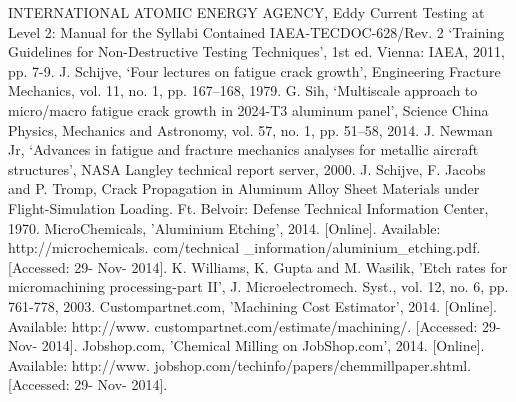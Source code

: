 \documentclass[12pt]{article}
\begin{document}
\noindent
[1] INTERNATIONAL ATOMIC ENERGY AGENCY, Eddy Current Testing at Level 2: Manual for the Syllabi Contained IAEA-TECDOC-628/Rev. 2 `Training Guidelines for Non-Destructive Testing Techniques', 1st ed. Vienna: IAEA, 2011, pp. 7-9.
\newline
\newline
\noindent
[2] J. Schijve, `Four lectures on fatigue crack growth', Engineering Fracture Mechanics, vol. 11, no. 1, pp. 167--168, 1979.
\newline
\newline
\noindent
[3] G. Sih, `Multiscale approach to micro/macro fatigue crack growth in 2024-T3 aluminum panel', Science China Physics, Mechanics and Astronomy, vol. 57, no. 1, pp. 51--58, 2014.
\newline
\newline
\noindent
[4] J. Newman Jr, `Advances in fatigue and fracture mechanics analyses for metallic aircraft structures', NASA Langley technical report server, 2000.
\newline
\newline
\noindent
[5] J. Schijve, F. Jacobs and P. Tromp, Crack Propagation in Aluminum Alloy Sheet Materials under Flight-Simulation Loading. Ft. Belvoir: Defense Technical Information Center, 1970.
\newline
\newline
\noindent
[6] MicroChemicals, 'Aluminium Etching', 2014. [Online]. Available: http://microchemicals. com/technical \_information/aluminium\_etching.pdf. [Accessed: 29- Nov- 2014].
\newline
\newline
\noindent
[7] K. Williams, K. Gupta and M. Wasilik, 'Etch rates for micromachining processing-part II', J. Microelectromech. Syst., vol. 12, no. 6, pp. 761-778, 2003.
\newline
\newline
\noindent
[8] Custompartnet.com, 'Machining Cost Estimator', 2014. [Online]. Available: http://www. custompartnet.com/estimate/machining/. [Accessed: 29- Nov- 2014].
\newline
\newline
\noindent
[9] Jobshop.com, 'Chemical Milling on JobShop.com', 2014. [Online]. Available: http://www. jobshop.com/techinfo/papers/chemmillpaper.shtml. [Accessed: 29- Nov- 2014].
\newline
\newline
\noindent
\end{document}
